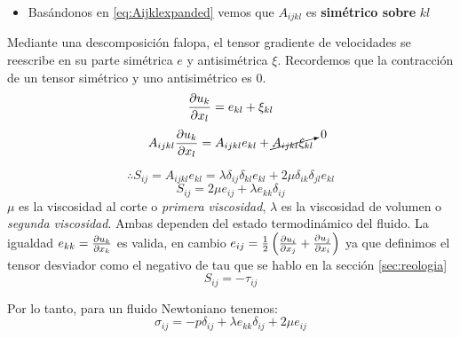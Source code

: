 \begin{itemize}
\item Basándonos en \ref{eq:Aijklexpanded} vemos que $A_{ijkl}$ es \textbf{simétrico sobre} $kl$
\end{itemize}
Mediante una descomposición falopa, el tensor gradiente de velocidades se reescribe en su parte simétrica $e$ y antisimétrica $\xi$. Recordemos que la contracción de un tensor simétrico y uno antisimétrico es $0$.
$$\frac{\partial u_k}{\partial x_l}=e_{kl}+\xi_{kl}$$
$$A_{ijkl}\frac{\partial u_k}{\partial x_l}=A_{ijkl}e_{kl}+\cancelto{0}{A_{ijkl}\xi_{kl}} $$

$$\therefore S_{ij}= A_{ijkl}e_{kl}=\lambda\delta_{ij}\delta_{kl}e_{kl} +2\mu\delta_{ik}\delta_{jl}e_{kl}$$
\begin{equation}
    S_{ij}=2\mu e_{ij}+\lambda e_{kk} \delta_{ij}
\end{equation}
$\mu$ es la viscosidad al corte o \emph{primera viscosidad}, $\lambda$ es la viscosidad de volumen o \emph{segunda viscosidad}. Ambas dependen del estado termodinámico del fluido. La igualdad $e_{kk}=\frac{\partial u_k}{\partial x_k}$ es valida, en cambio $e_{ij}=\frac{1}{2}\left(\frac{\partial u_i}{\partial x_j}+\frac{\partial u_j}{\partial x_i}\right)$ ya que definimos el tensor desviador como el negativo de tau que se hablo en la sección \ref{sec:reologia}
\[
S_{ij}=-\tau_{ij}
\]

Por lo tanto, para un fluido Newtoniano tenemos:
\begin{equation}\label{eq:sigmanewt}
\sigma_{ij}=-p\delta_{ij}+\lambda e_{kk}\delta_{ij}+2\mu e_{ij} 
\end{equation}






